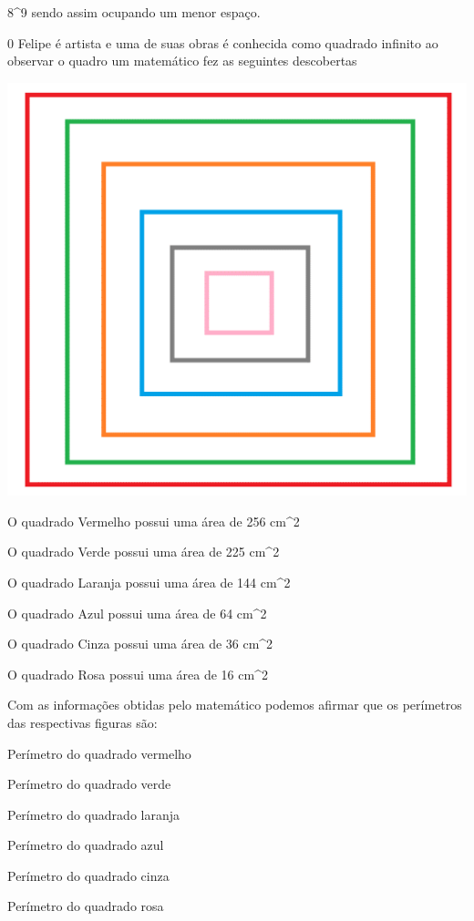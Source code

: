 8^9 sendo assim ocupando um
menor espaço.

\num{0} Felipe é artista e uma de suas obras é conhecida como quadrado
infinito ao observar o quadro um matemático fez as seguintes descobertas

\includegraphics[width=2\times 3125in,height=2\times 07917in]{./imgSAEB_8_MAT/media/image2.png}

O quadrado Vermelho possui uma área de 256 cm^2

O quadrado Verde possui uma área de 225 cm^2

O quadrado Laranja possui uma área de 144 cm^2

O quadrado Azul possui uma área de 64 cm^2

O quadrado Cinza possui uma área de 36 cm^2

O quadrado Rosa possui uma área de 16 cm^2

Com as informações obtidas pelo matemático podemos afirmar que os
perímetros das respectivas figuras são:

\item Perímetro do quadrado vermelho
\item Perímetro do quadrado verde
\item Perímetro do quadrado laranja
\item Perímetro do quadrado azul
\item Perímetro do quadrado cinza
\item Perímetro do quadrado rosa

